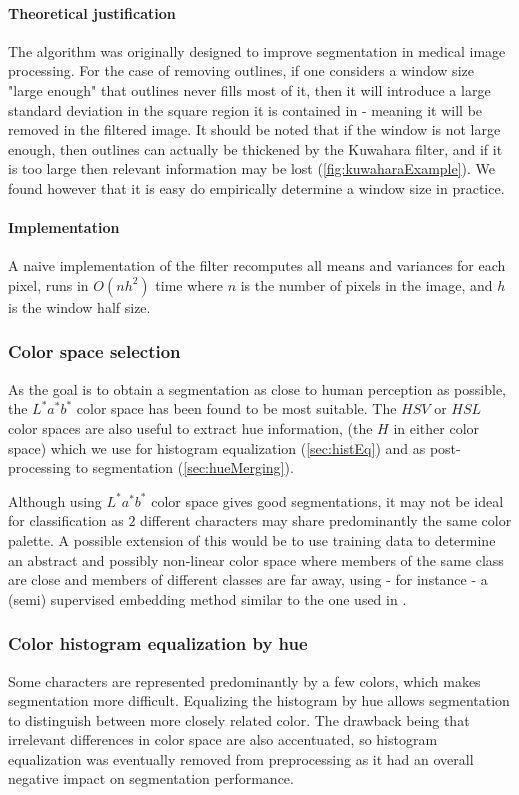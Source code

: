 \paragraph{Theoretical justification} The algorithm was originally designed to improve segmentation in medical image processing. For the case of removing outlines, if one considers a window size "large enough" that outlines never fills most of it, then it will introduce a large standard deviation in the square region it is contained in - meaning it will be removed in the filtered image. It should be noted that if the window is not large enough, then outlines can actually be thickened by the Kuwahara filter, and if it is too large then relevant information may be lost (\autoref{fig:kuwaharaExample}). We found however that it is easy do empirically determine a window size in practice.

\paragraph{Implementation} A naive implementation of the filter recomputes all means and variances for each pixel, runs in $O(nh^2)$ time where $n$ is the number of pixels in the image, and $h$ is the window half size.

\subsubsection{Color space selection}

As the goal is to obtain a segmentation as close to human perception as possible, the $L^*a^*b^*$ color space has been found to be most suitable. The $HSV$ or $HSL$ color spaces are also useful to extract hue information, (the $H$ in either color space) which we use for histogram equalization (\autoref{sec:histEq}) and as post-processing to segmentation (\autoref{sec:hueMerging}).

Although using $L^*a^*b^*$ color space gives good segmentations, it may not be ideal for classification as $2$ different characters may share predominantly the same color palette. A possible extension of this would be to use training data to determine an abstract and possibly non-linear color space where members of the same class are close and members of different classes are far away, using - for instance - a (semi) supervised embedding method similar to the one used in \cite{urahama2007semi}.

\subsubsection{Color histogram equalization by hue}
\label{sec:histEq}

Some characters are represented predominantly by a few colors, which makes segmentation more difficult. Equalizing the histogram by hue allows segmentation to distinguish between more closely related color. The drawback being that irrelevant differences in color space are also accentuated, so histogram equalization was eventually removed from preprocessing as it had an overall negative impact on segmentation performance.
